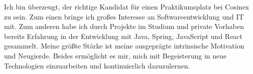 \documentclass[11pt, a4paper]{awesome-cv}
\begin{document}
\begin{cvletter}
Ich bin überzeugt, der richtige Kandidat für einen Praktikumsplatz bei Cosinex zu sein. Zum einen bringe ich großes Interesse an Softwareentwicklung und IT mit. 
Zum anderen habe ich durch Projekte im Studium und private Vorhaben bereits Erfahrung in der Entwicklung mit Java, Spring, JavaScript und React gesammelt.
Meine größte Stärke ist meine ausgeprägte intrinsische Motivation und Neugierde. 
Beides ermöglicht es mir, mich mit Begeisterung in neue Technologien einzuarbeiten und kontinuierlich dazuzulernen.
\end{cvletter}


\makeletterclosing
\end{document}
